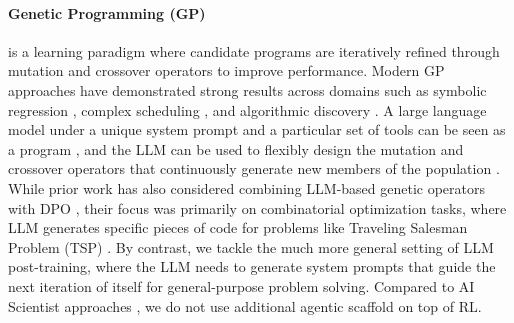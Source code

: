 \documentclass{article}
\theoremstyle{plain}
\theoremstyle{definition}
\theoremstyle{remark}
\begin{document}
\vspace{-2pt}
\paragraph{Genetic Programming (GP)} is a learning paradigm where candidate programs are iteratively refined through mutation and crossover operators \cite{koza1994genetic, banzhaf1998genetic, langdon2013foundations} to improve performance. Modern GP approaches have demonstrated strong results across domains such as symbolic regression \cite{ma2022evolving}, complex scheduling \cite{nguyen2017genetic}, and algorithmic discovery \cite{chen2023symbolic}. A large language model under a unique system prompt and a particular set of tools can be seen as a program \cite{elm, llm-sr, romera2024mathematical, opsahl2024optimizing}, and the LLM can be used to flexibly design the mutation and crossover operators that continuously generate new members of the population \cite{hemberg2024evolving, gepa, alphaevolve}. While prior work \cite{algo-discovery-with-llm} has also considered combining LLM-based genetic operators \cite{romera2024mathematical} with DPO \cite{dpo}, their focus was primarily on combinatorial optimization tasks, where LLM generates specific pieces of code for problems like Traveling Salesman Problem (TSP) \cite{tsp}. By contrast, we tackle the much more general setting of LLM post-training, where the LLM needs to generate system prompts that guide the next iteration of itself for general-purpose problem solving. Compared to AI Scientist approaches \cite{ai-co-scientist}, we do not use additional agentic scaffold on top of RL.
\end{document}
